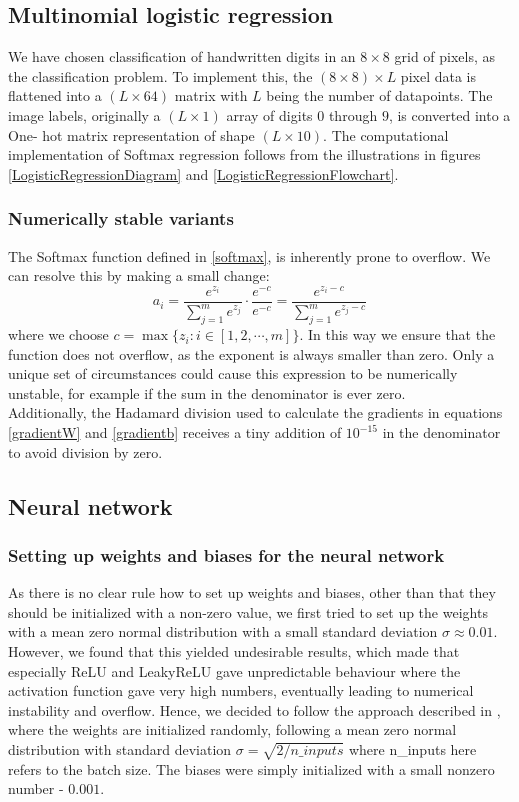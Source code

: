 \documentclass[11pt,a4paper,titlepage]{article}
\begin{document}
\subsection{Multinomial logistic regression}
We have chosen classification of handwritten digits in an $8\times 8$ grid of pixels, as the classification problem. To implement this, the $(8\times 8)\times L$ pixel data is flattened into a $(L \times 64)$ matrix with $L$ being the number of datapoints. The image labels, originally a $(L \times 1)$ array of digits $0$ through $9$, is converted into a One- hot matrix representation of shape $(L \times 10)$. The computational implementation of Softmax regression follows from the illustrations in figures \ref{LogisticRegressionDiagram} and \ref{LogisticRegressionFlowchart}. 

\subsubsection{Numerically stable variants}
The Softmax function defined in \eqref{softmax}, is inherently prone to overflow. We can resolve this by making a small change:
\begin{equation}
a_i= \frac{e^{z_i}}{\sum_{j=1}^{m} e^{z_j}} \cdot \frac{e^{-c}}{e^{-c}} = \frac{e^{z_i-c}}{\sum_{j=1}^{m} e^{z_j-c}}
\end{equation}
where we choose $c = \max \{ z_i : i \in [1,2,\cdots ,m]\} $. In this way we ensure that the function does not overflow, as the exponent is always smaller than zero. Only a unique set of circumstances could cause this expression to be numerically unstable, for example if the sum in the denominator is ever zero.\\Additionally, the Hadamard division used to calculate the gradients in equations \eqref{gradientW} and \eqref{gradientb} receives a tiny addition of $10^{-15}$ in the denominator to avoid division by zero.

\subsection{Neural network}
\subsubsection{Setting up weights and biases for the neural network}
As there is no clear rule how to set up weights and biases, other than that they should be initialized with a non-zero value, we first tried to set up the weights with a mean zero normal distribution with a small standard deviation $\sigma\approx0.01$. However, we found that this yielded undesirable results, which made that especially ReLU and LeakyReLU gave unpredictable behaviour where the activation function gave very high numbers, eventually leading to numerical instability and overflow. Hence, we decided to follow the approach described in \cite{DelvingDeep}, where the weights are initialized randomly, following a mean zero normal distribution with standard deviation $\sigma=\sqrt{2/n\_inputs}$ where n\_inputs here refers to the batch size. The biases were simply initialized with a small nonzero number - $0.001$.
\end{document}
